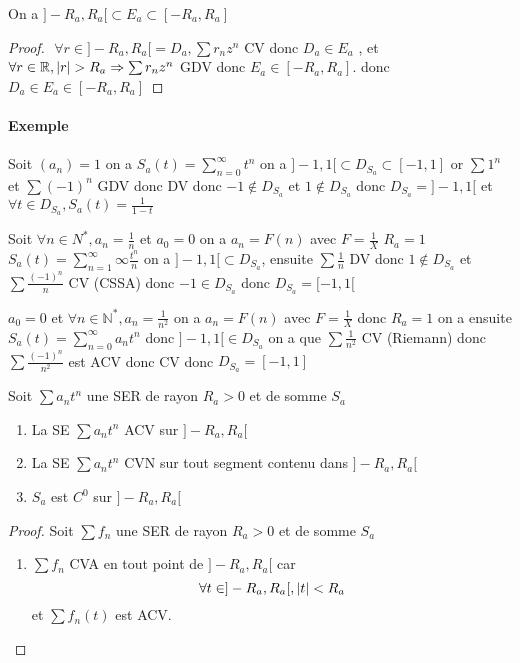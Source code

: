 \documentclass[11pt,hidelinks]{book}
\theoremstyle{mytheoremstyle}
\theoremstyle{mytheoremstyle}
\theoremstyle{mytheoremstyle}
\theoremstyle{mytheoremstyle}
\theoremstyle{mytheoremstyle}
\theoremstyle{mytheoremstyle}
\theoremstyle{mytheoremstyle}
\theoremstyle{mytheoremstyle}
\theoremstyle{myproblemstyle}
\def\mbb#1{\mathbb{#1}}
\def\bN{\mbb{N}}
\def\bR{\mbb{R}}
\def\is#1{\sum_{n=0}^\infty #1}
\def\iss#1#2{\sum_{n=#1}^\infty #2}
\def\ser{\sum a_n t^n}
\def\seb#1{\sum #1_n z^n}
\begin{document}
\begin{adjustwidth}{-2em}{-1em}
    \begin{prop}
        On a $]-R_a, R_a[ \subset E_a \subset [-R_a, R_a]$
        \begin{proof}$ $\newline
            $\forall r \in ]-R_a, R_a[ = D_a, \seb{r}$ CV donc $D_a \in E_a$ , et $\forall r \in \bR, \abs{r} > R_a \Rightarrow \seb{r}$ GDV
            donc $E_a \in [-R_a, R_a]$. 
            donc $D_a \in E_a \in [-R_a, R_a]$
        \end{proof}
    \end{prop}
    \paragraph{Exemple}
    \begin{ex}
        Soit $(a_n) = 1$ on a $S_a(t) = \is{t^n}$ on a $]-1,1[ \subset D_{S_a} \subset [-1,1]$
        or $\sum 1^n$ et $\sum (-1)^n$ GDV donc DV 
        donc $-1 \not \in D_{S_a}$ et $1 \not \in D_{S_a}$ donc 
        $D_{S_a} = ]-1,1[$ et $\forall t \in D_{S_a}, S_a(t) = \frac{1}{1-t}$
    \end{ex}
    \begin{ex}
        Soit $\forall n \in N^*, a_n = \frac{1}{n}$ et $a_0 = 0$
        on a $a_n = F(n)$ avec $F = \frac{1}{X}$ $R_a = 1$ $S_a(t) = \iss{1}{\infty} \frac{t^n}{n}$ 
        on a $]-1,1[ \subset D_{S_a}$, ensuite $\sum \frac{1}{n}$ DV donc $1 \not \in D_{S_a}$ 
        et $\sum \frac{(-1)^n}{n}$ CV (CSSA) donc $-1 \in D_{S_a}$
        donc $D_{S_a} = [-1,1[$
    \end{ex}
    \begin{ex}
        $a_0 = 0$ et $\forall n \in \bN^*, a_n = \frac{1}{n^2}$
        on a $a_n = F(n)$ avec $F = \frac{1}{X}$ donc $R_a = 1$ 
        on a ensuite $S_a(t) = \is{a_nt^n}$ donc $]-1,1[ \in D_{S_a}$ 
        on a que $\sum \frac{1}{n^2}$ CV (Riemann) donc $\sum \frac{(-1)^n}{n^2}$ est ACV donc CV
        donc $D_{S_a} = [-1,1]$
    \end{ex}
    \begin{theorem}
        Soit $\ser$ une SER de rayon $R_a > 0$ et de somme $S_a$ 
        \begin{enumerate} 
        \item La SE $\ser$ ACV sur $]-R_a,R_a[$ 
        \item La SE $\ser$ CVN sur tout segment contenu dans $]-R_a,R_a[$ 
        \item $S_a$ est $C^0$ sur $]-R_a, R_a[$
        \end{enumerate}
        \begin{proof}
            Soit $\sum f_n$ une SER de rayon $R_a > 0$ et de somme $S_a$
            \begin{enumerate}
            \item $\sum f_n$ CVA en tout point de $]-R_a, R_a[$ car 
            \begin{equation*}
                \forall t \in ]-R_a, R_a[, \abs{t} < R_a
            \end{equation*}
            et $\sum f_n(t)$ est ACV. 


\end{enumerate}
\end{proof}
\end{theorem}
\end{adjustwidth}
\end{document}
